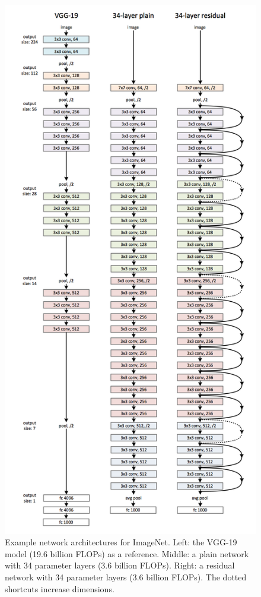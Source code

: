 \documentclass[10pt,twocolumn,letterpaper]{article}
\begin{document}
\begin{figure}
	\begin{center}
		\includegraphics[width=1.0\linewidth]{resnet}
	\end{center}
	\caption{Example network architectures for ImageNet. Left: the
		VGG-19 model (19.6 billion FLOPs) as a reference. Middle:
		a plain network with 34 parameter layers (3.6 billion FLOPs).
		Right: a residual network with 34 parameter layers (3.6 billion
		FLOPs). The dotted shortcuts increase dimensions. }
	\label{fig:resnet}
\end{figure}
\end{document}
